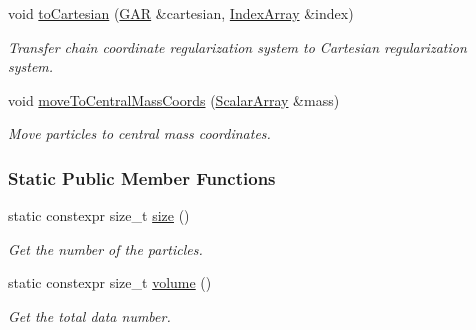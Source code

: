 \begin{DoxyCompactItemize}
void \mbox{\hyperlink{class_g_a_r_a2a282218e90ffb1a367da364b70e54a3}{to\+Cartesian}} (\mbox{\hyperlink{class_g_a_r}{G\+AR}} \&cartesian, \mbox{\hyperlink{class_g_a_r_aaf033049c0cd8f0f86a82b9595086fa5}{Index\+Array}} \&index)
\begin{DoxyCompactList}\small\item\em Transfer chain coordinate regularization system to Cartesian regularization system. \end{DoxyCompactList}\item 
void \mbox{\hyperlink{class_g_a_r_a373d938047a04b051683ee93198b1832}{move\+To\+Central\+Mass\+Coords}} (\mbox{\hyperlink{class_g_a_r_a0b446684ae922457a3bf86c904085d8a}{Scalar\+Array}} \&mass)
\begin{DoxyCompactList}\small\item\em Move particles to central mass coordinates. \end{DoxyCompactList}\end{DoxyCompactItemize}
\subsubsection*{Static Public Member Functions}
\begin{DoxyCompactItemize}
\item 
static constexpr size\+\_\+t \mbox{\hyperlink{class_g_a_r_a850c24cdfd1656389e3e42f575035edb}{size}} ()
\begin{DoxyCompactList}\small\item\em Get the number of the particles. \end{DoxyCompactList}\item 
static constexpr size\+\_\+t \mbox{\hyperlink{class_g_a_r_abdbcc31db058125bd2ee207e7648b20b}{volume}} ()
\begin{DoxyCompactList}\small\item\em Get the total data number. \end{DoxyCompactList}\end{DoxyCompactItemize}
